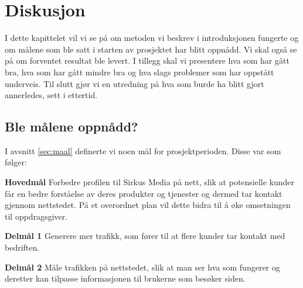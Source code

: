 \cleardoublepage
\chapter{Diskusjon}
\label{chap:discussion} 

I dette kapittelet vil vi se på om metoden vi beskrev i introduksjonen fungerte og om målene som ble satt i starten av prosjektet har blitt oppnådd. Vi skal også se på om forventet resultat ble levert. I tillegg skal vi presentere hva som har gått bra, hva som har gått mindre bra og hva slags problemer som har oppstått underveis. Til slutt gjør vi en utredning på hva som burde ha blitt gjort annerledes, sett i ettertid.

\section{Ble målene oppnådd?}
I avsnitt \ref{sec:maal} definerte vi noen mål for prosjektperioden. Disse var som følger:

\begin{compactitem}
    \item [{\bf Hovedmål}] Forbedre profilen til Sirkus Media på nett, slik at potensielle kunder får en bedre forståelse av deres produkter og tjenester og dermed tar kontakt gjennom nettstedet. På et overordnet plan vil dette bidra til å øke omsetningen til oppdragsgiver.
    \begin{compactitem}
        \item [{\bf  Delmål 1} ] Generere mer trafikk, som fører til at flere kunder tar kontakt med bedriften. 
        \item [{\bf  Delmål 2} ] Måle trafikken på nettstedet, slik at man ser hva som fungerer og deretter kan tilpasse informasjonen til brukerne som besøker siden.
    \end{compactitem}
\end{compactitem}

